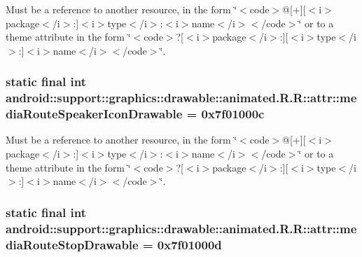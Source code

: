 Must be a reference to another resource, in the form \char`\"{}$<$code$>$@\mbox{[}+\mbox{]}\mbox{[}$<$i$>$package$<$/i$>$:\mbox{]}$<$i$>$type$<$/i$>$:$<$i$>$name$<$/i$>$$<$/code$>$\char`\"{} or to a theme attribute in the form \char`\"{}$<$code$>$?\mbox{[}$<$i$>$package$<$/i$>$:\mbox{]}\mbox{[}$<$i$>$type$<$/i$>$:\mbox{]}$<$i$>$name$<$/i$>$$<$/code$>$\char`\"{}. \hypertarget{classandroid_1_1support_1_1graphics_1_1drawable_1_1animated_1_1_r_1_1attr_35bdfcce525e107feedf8d1f6b68bdf8}{
\subsubsection[{mediaRouteSpeakerIconDrawable}]{\setlength{\rightskip}{0pt plus 5cm}static final int android::support::graphics::drawable::animated.R.R::attr::mediaRouteSpeakerIconDrawable = 0x7f01000c}}
\label{classandroid_1_1support_1_1graphics_1_1drawable_1_1animated_1_1_r_1_1attr_35bdfcce525e107feedf8d1f6b68bdf8}


Must be a reference to another resource, in the form \char`\"{}$<$code$>$@\mbox{[}+\mbox{]}\mbox{[}$<$i$>$package$<$/i$>$:\mbox{]}$<$i$>$type$<$/i$>$:$<$i$>$name$<$/i$>$$<$/code$>$\char`\"{} or to a theme attribute in the form \char`\"{}$<$code$>$?\mbox{[}$<$i$>$package$<$/i$>$:\mbox{]}\mbox{[}$<$i$>$type$<$/i$>$:\mbox{]}$<$i$>$name$<$/i$>$$<$/code$>$\char`\"{}. \hypertarget{classandroid_1_1support_1_1graphics_1_1drawable_1_1animated_1_1_r_1_1attr_1f88bc6161524670e388e086035c8685}{
\subsubsection[{mediaRouteStopDrawable}]{\setlength{\rightskip}{0pt plus 5cm}static final int android::support::graphics::drawable::animated.R.R::attr::mediaRouteStopDrawable = 0x7f01000d}}
\label{classandroid_1_1support_1_1graphics_1_1drawable_1_1animated_1_1_r_1_1attr_1f88bc6161524670e388e086035c8685}



